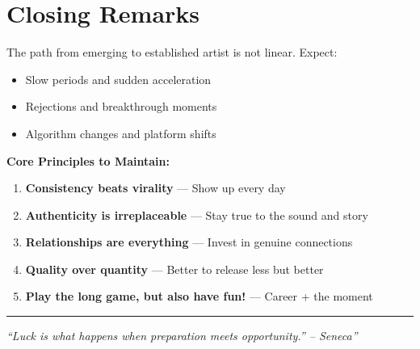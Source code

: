 \documentclass[11pt,a4paper]{article}
\begin{document}
\section{Closing Remarks}

The path from emerging to established artist is not linear. Expect:
\begin{itemize}[leftmargin=*]
    \item Slow periods and sudden acceleration
    \item Rejections and breakthrough moments
    \item Algorithm changes and platform shifts
\end{itemize}

\vspace{1em}

\noindent\textbf{Core Principles to Maintain:}
\begin{enumerate}[leftmargin=*]
    \item \textbf{Consistency beats virality} --- Show up every day
    \item \textbf{Authenticity is irreplaceable} --- Stay true to the sound and story
    \item \textbf{Relationships are everything} --- Invest in genuine connections
    \item \textbf{Quality over quantity} --- Better to release less but better
    \item \textbf{Play the long game, but also have fun!} --- Career + the moment
\end{enumerate}

\vspace{2em}

\begin{center}
\rule{0.6\textwidth}{0.5pt}
\end{center}

\vspace{1em}

\begin{quotebox}
\centering
\large\textit{``Luck is what happens when preparation meets opportunity.'' -- Seneca''}
\end{quotebox}

\vspace{2em}
\end{document}
